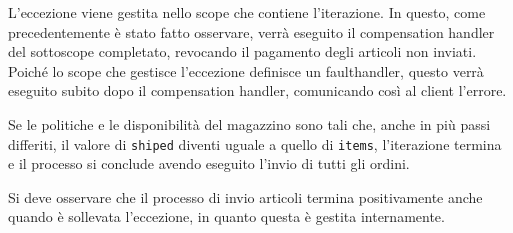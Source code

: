 L'eccezione viene gestita nello scope che contiene l'iterazione. 
In questo, come precedentemente è stato fatto osservare, verrà eseguito 
il compensation handler del sottoscope completato,
revocando il pagamento degli articoli non inviati.
Poiché lo scope che gestisce l'eccezione definisce un
faulthandler, questo verrà eseguito subito dopo il compensation handler,
comunicando così al client l'errore.

Se le politiche e le disponibilità del magazzino sono tali che, anche
in più passi differiti, il valore di \texttt{shiped} diventi uguale a quello di
\texttt{items}, l'iterazione termina e il processo si conclude avendo eseguito
l'invio di tutti gli ordini.

Si deve osservare che il processo di invio articoli termina positivamente anche
quando è sollevata l'eccezione, in quanto questa è gestita internamente.
\\

